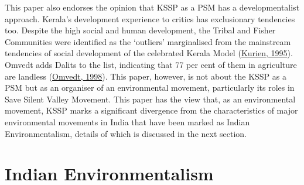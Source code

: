 \documentclass[twoside, 13pt]{article}
\begin{document}
{This paper also endorses the opinion that KSSP as a PSM has a developmentalist approach. Kerala’s development experience to critics has exclusionary tendencies too. Despite the high social and human development, the Tribal and Fisher Communities were identified as the ‘outliers’ marginalised from the mainstream tendencies of social development of the celebrated Kerala Model (\underline{Kurien, 1995}). Omvedt adds Dalits to the list, indicating that 77 per cent of them in agriculture are landless (\underline{Omvedt, 1998}). This paper, however, is not about the KSSP as a PSM but as an organiser of an environmental movement, particularly its roles in Save Silent Valley Movement. This paper has the view that, as an environmental movement, KSSP marks a significant divergence from the characteristics of major environmental movements in India that have been marked as Indian Environmentalism, details of which is discussed in the next section.} 

\newpage


{\fontsize{18}{20}\selectfont\section*{Indian Environmentalism}}

\vspace{-.5cm}
\end{document}
